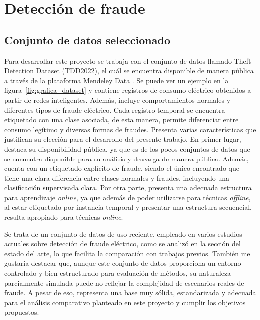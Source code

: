 \documentclass[12pt,a4paper]{report}
\begin{document}
\chapter{Detección de fraude}


\section{Conjunto de datos seleccionado}

Para desarrollar este proyecto se trabaja con el conjunto de datos llamado Theft Detection Dataset (TDD2022), el cuál se encuentra disponible de manera pública a través de la plataforma Mendeley Data \cite{dataset}. Se puede ver un ejemplo en la figura~\ref{fig:grafica_dataset} y contiene registros de consumo eléctrico obtenidos a partir de redes inteligentes. Además, incluye comportamientos normales y diferentes tipos de fraude eléctrico. Cada registro temporal se encuentra etiquetado con una clase asociada, de esta manera, permite diferenciar entre consumo legítimo y diversas formas de fraudes. Presenta varias características que justifican su elección para el desarrollo del presente trabajo. En primer lugar, destaca su disponibilidad pública, ya que es de los pocos conjuntos de datos que se encuentra disponible para su análisis y descarga de manera pública.  Además, cuenta con un etiquetado explícito de fraude, siendo el único encontrado que tiene una clara diferencia entre clases normales y fraudes, incluyendo una clasificación supervisada clara.  Por otra parte, presenta una adecuada estructura para aprendizaje \emph{online}, ya que además de poder utilizarse para técnicas \emph{offline}, al estar etiquetado por instancia temporal y presentar una estructura secuencial, resulta apropiado para técnicas \emph{online}. 

Se trata de un conjunto de datos de uso reciente, empleado en varios estudios actuales sobre detección de fraude eléctrico, como se analizó en la sección del estado del arte, lo que facilita la comparación con trabajos previos. También me gustaría destacar que, aunque este conjunto de datos proporciona un entorno controlado y bien estructurado para evaluación de métodos, su naturaleza parcialmente simulada puede no reflejar la complejidad de escenarios reales de fraude. A pesar de eso, representa una base muy sólida, estandarizada y adecuada para el análisis comparativo planteado en este proyecto y cumplir los objetivos propuestos.
\end{document}
